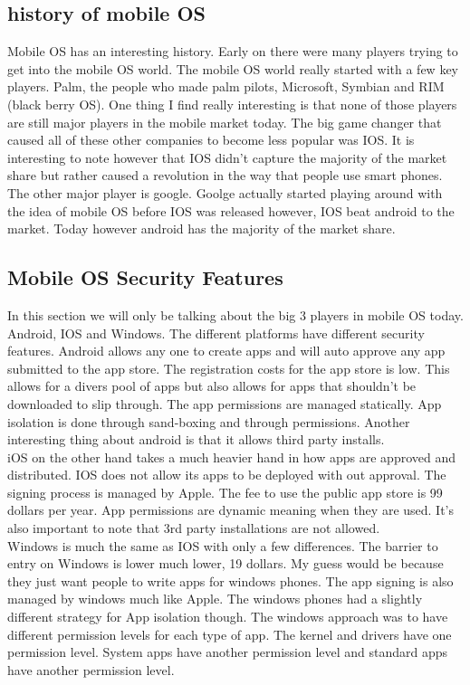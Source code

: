 \documentclass[letterpaper, onecolumn,10pt]{IEEEtran}
\begin{document}
		    \subsection{history of mobile OS}
		     Mobile OS has an interesting history. Early on there were many players trying to get into the mobile OS world. The mobile OS world really started with a few key players. Palm, the people who made palm pilots, Microsoft, Symbian and RIM (black berry OS). One thing I find really interesting is that none of those players are still major players in the mobile market today. The big game changer that caused all of these other companies to become less popular was IOS. It is interesting to note however that IOS didn't capture the majority of the market share but rather caused a revolution in the way that people use smart phones. The other major player is google. Goolge actually started playing around with the idea of mobile OS before IOS was released however, IOS beat android to the market. Today however android has the majority of the market share.\\
		     
		     \subsection{Mobile OS Security Features}
		     In this section we will only be talking about the big 3 players in mobile OS today. Android, IOS and Windows. The different platforms have different security features. Android allows any one to create apps and will auto approve any app submitted to the app store. The registration costs for the app store is low. This allows for a divers pool of apps but also allows for apps that shouldn't be downloaded to slip through. The app permissions are managed statically. App isolation is done through sand-boxing and through permissions. Another interesting thing about android is that it allows third party installs.\\
		     
		     iOS on the other hand takes a much heavier hand in how apps are approved and distributed. IOS does not allow its apps to be deployed with out approval. The signing process is managed by Apple. The fee to use the public app store is 99 dollars per year. App permissions are dynamic meaning when they are used. It's also important to note that 3rd party installations are not allowed.\\
		     
		     Windows is much the same as IOS with only a few differences. The barrier to entry on Windows is lower much lower, 19 dollars. My guess would be because they just want people to write apps for windows phones. The app signing is also managed by windows much like Apple. The windows phones had a slightly different strategy for App isolation though. The windows approach was to have different permission levels for each type of app. The kernel and drivers have one permission level. System apps have another permission level and standard apps have another permission level.\\
		     
\end{document}
